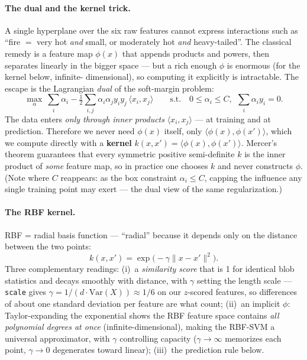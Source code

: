 \documentclass[11pt]{article}
\newcommand{\code}[1]{\texttt{\small #1}}
\begin{document}
\paragraph{The dual and the kernel trick.}
A single hyperplane over the six raw features cannot express interactions
such as ``fire $=$ very hot \emph{and} small, or moderately hot \emph{and}
heavy-tailed''. The classical remedy is a feature map $\phi(x)$ that
appends products and powers, then separates linearly in the bigger space
--- but a rich enough $\phi$ is enormous (for the kernel below, infinite-%
dimensional), so computing it explicitly is intractable. The escape is the
Lagrangian \emph{dual} of the soft-margin problem:
\[
\max_{\alpha}\ \sum_i\alpha_i-\tfrac12\sum_{i,j}
\alpha_i\alpha_j y_i y_j\,\langle x_i,x_j\rangle
\qquad\text{s.t.}\quad 0\leq\alpha_i\leq C,\ \ \textstyle\sum_i\alpha_i y_i=0 .
\]
The data enters \emph{only through inner products} $\langle x_i,x_j\rangle$
--- at training and at prediction. Therefore we never need $\phi(x)$
itself, only $\langle\phi(x),\phi(x')\rangle$, which we compute directly
with a \textbf{kernel} $k(x,x')=\langle\phi(x),\phi(x')\rangle$. Mercer's
theorem guarantees that every symmetric positive semi-definite $k$ is the
inner product of \emph{some} feature map, so in practice one chooses $k$
and never constructs $\phi$. (Note where $C$ reappears: as the box
constraint $\alpha_i\leq C$, capping the influence any single training
point may exert --- the dual view of the same regularization.)

\paragraph{The RBF kernel.}
RBF = radial basis function --- ``radial'' because it depends only on the
distance between the two points:
\[
k(x,x')=\exp\bigl(-\gamma\|x-x'\|^2\bigr).
\]
Three complementary readings: (i)~a \emph{similarity score} that is 1 for
identical blob statistics and decays smoothly with distance, with $\gamma$
setting the length scale --- \code{scale} gives
$\gamma=1/(d\cdot\mathrm{Var}(X))\approx1/6$ on our $z$-scored features,
so differences of about one standard deviation per feature are what count;
(ii)~an implicit $\phi$: Taylor-expanding the exponential shows the RBF
feature space contains \emph{all polynomial degrees at once}
(infinite-dimensional), making the RBF-SVM a universal approximator, with
$\gamma$ controlling capacity ($\gamma\to\infty$ memorizes each point,
$\gamma\to0$ degenerates toward linear); (iii)~the prediction rule below.
\end{document}
